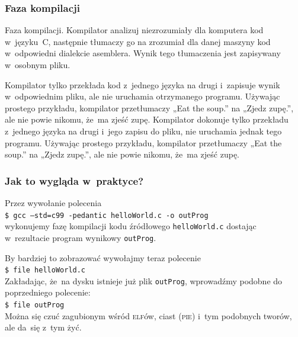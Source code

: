 \documentclass[10pt,t]{beamer}
\begin{document}
\begin{frame}
  \frametitle{Faza kompilacji}


  \alert{Faza kompilacji.} Kompilator analizuj niezrozumiały dla komputera
  kod w~języku~C, następnie tłumaczy go na zrozumiał dla danej maszyny kod
  w~odpowiedni dialekcie asemblera. Wynik tego tłumaczenia jest zapisywany
  w~osobnym pliku.

  Kompilator \alert{tylko} przekłada kod z~jednego języka na drugi
  i~zapisuje wynik w~odpowiednim pliku, ale \alert{nie} uruchamia
  otrzymanego programu. Używając prostego przykładu, kompilator
  przetłumaczy „Eat the soup.” na „Zjedz zupę.”, ale nie powie nikomu,
  że~ma zjeść zupę. Kompilator dokonuje \alert{tylko} przekładu z~jednego
  języka na drugi i~jego zapisu do pliku, \alert{nie} uruchamia jednak tego
  programu. Używając prostego przykładu, kompilator przetłumaczy „Eat the
  soup.” na „Zjedz zupę.”, ale nie powie nikomu, że~ma zjeść zupę.


\end{frame}






\begin{frame}
  \frametitle{Jak to wygląda w~praktyce?}


  Przez wywołanie polecenia \\
  \texttt{\$ gcc --std=c99 -pedantic helloWorld.c -o outProg} \\
  wykonujemy fazę kompilacji kodu źródłowego \texttt{helloWorld.c}
  dostając w~rezultacie program wynikowy \texttt{outProg}.

  By bardziej to zobrazować wywołajmy teraz polecenie \\
  \texttt{\$ file helloWorld.c} \\
  Zakładając, że~na dysku istnieje już plik \texttt{outProg}, wprowadźmy
  podobne do poprzedniego polecenie: \\
  \texttt{\$ file outProg} \\
  Można się czuć zagubionym wśród \textsc{elf}ów, ciast (\textsc{pie})
  i~tym podobnych tworów, ale da~się z~tym żyć.


\end{frame}
\end{document}
